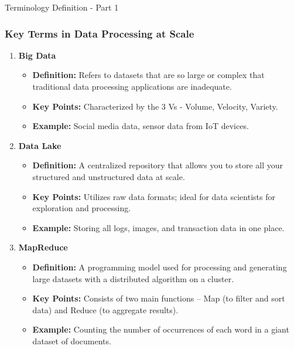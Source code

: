 \documentclass[aspectratio=169]{beamer}
\begin{document}
\begin{frame}[fragile]{Terminology Definition - Part 1}
    \frametitle{Key Terms in Data Processing at Scale}
    \begin{enumerate}
        \item \textbf{Big Data}
        \begin{itemize}
            \item \textbf{Definition:} Refers to datasets that are so large or complex that traditional data processing applications are inadequate.
            \item \textbf{Key Points:} Characterized by the 3 Vs - Volume, Velocity, Variety.
            \item \textbf{Example:} Social media data, sensor data from IoT devices.
        \end{itemize}
        
        \item \textbf{Data Lake}
        \begin{itemize}
            \item \textbf{Definition:} A centralized repository that allows you to store all your structured and unstructured data at scale.
            \item \textbf{Key Points:} Utilizes raw data formats; ideal for data scientists for exploration and processing.
            \item \textbf{Example:} Storing all logs, images, and transaction data in one place.
        \end{itemize}

        \item \textbf{MapReduce}
        \begin{itemize}
            \item \textbf{Definition:} A programming model used for processing and generating large datasets with a distributed algorithm on a cluster.
            \item \textbf{Key Points:} Consists of two main functions – Map (to filter and sort data) and Reduce (to aggregate results).
            \item \textbf{Example:} Counting the number of occurrences of each word in a giant dataset of documents.
        \end{itemize}
    \end{enumerate}
\end{frame}
\end{document}
